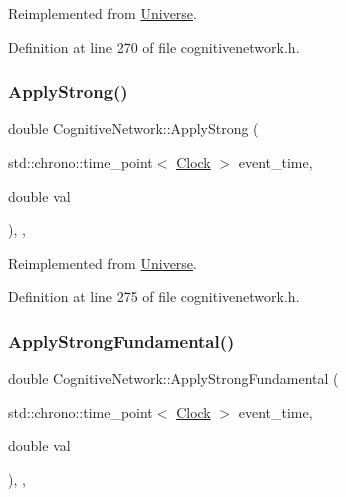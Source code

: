 Reimplemented from \hyperlink{class_universe_a76c0b5e63c2a7d1988c44db341c3d64c}{Universe}.



Definition at line 270 of file cognitivenetwork.\+h.

\mbox{\label{class_cognitive_network_a7a55750d3c42a277c4ffe04a87ab3b19}} 
\subsubsection{\texorpdfstring{Apply\+Strong()}{ApplyStrong()}}
{\footnotesize\ttfamily double Cognitive\+Network\+::\+Apply\+Strong (\begin{DoxyParamCaption}\item[{std\+::chrono\+::time\+\_\+point$<$ \hyperlink{universe_8h_a0ef8d951d1ca5ab3cfaf7ab4c7a6fd80}{Clock} $>$}]{event\+\_\+time,  }\item[{double}]{val }\end{DoxyParamCaption})\hspace{0.3cm}{\ttfamily [inline]}, {\ttfamily [final]}, {\ttfamily [virtual]}}



Reimplemented from \hyperlink{class_universe_a906a88b37f10bfa630bef49dfd0e907a}{Universe}.



Definition at line 275 of file cognitivenetwork.\+h.

\mbox{\label{class_cognitive_network_af25bbd4f4d8f370cd2a48fd6db8302b9}} 
\subsubsection{\texorpdfstring{Apply\+Strong\+Fundamental()}{ApplyStrongFundamental()}}
{\footnotesize\ttfamily double Cognitive\+Network\+::\+Apply\+Strong\+Fundamental (\begin{DoxyParamCaption}\item[{std\+::chrono\+::time\+\_\+point$<$ \hyperlink{universe_8h_a0ef8d951d1ca5ab3cfaf7ab4c7a6fd80}{Clock} $>$}]{event\+\_\+time,  }\item[{double}]{val }\end{DoxyParamCaption})\hspace{0.3cm}{\ttfamily [inline]}, {\ttfamily [final]}, {\ttfamily [virtual]}}



